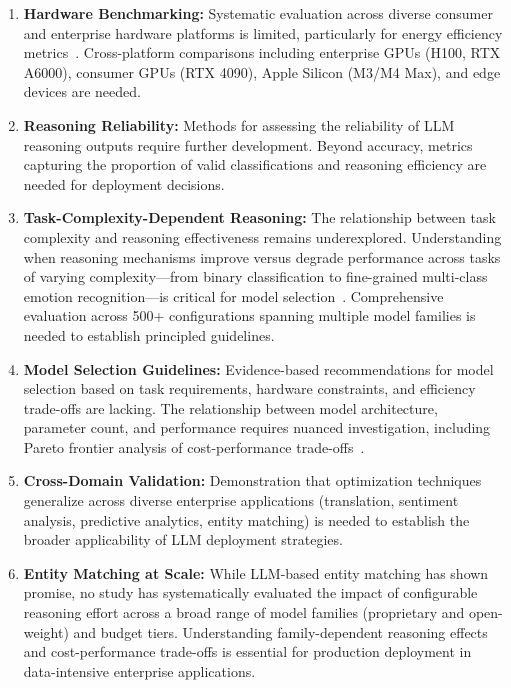 \begin{enumerate}[leftmargin=*]
    \item \textbf{Hardware Benchmarking:} Systematic evaluation across diverse consumer and enterprise hardware platforms is limited, particularly for energy efficiency metrics~\cite{chitty2024llm}. Cross-platform comparisons including enterprise GPUs (H100, RTX A6000), consumer GPUs (RTX 4090), Apple Silicon (M3/M4 Max), and edge devices are needed.
    
    \item \textbf{Reasoning Reliability:} Methods for assessing the reliability of LLM reasoning outputs require further development. Beyond accuracy, metrics capturing the proportion of valid classifications and reasoning efficiency are needed for deployment decisions.
    
    \item \textbf{Task-Complexity-Dependent Reasoning:} The relationship between task complexity and reasoning effectiveness remains underexplored. Understanding when reasoning mechanisms improve versus degrade performance across tasks of varying complexity---from binary classification to fine-grained multi-class emotion recognition---is critical for model selection~\cite{li2025financial}. Comprehensive evaluation across 500+ configurations spanning multiple model families is needed to establish principled guidelines.
    
    \item \textbf{Model Selection Guidelines:} Evidence-based recommendations for model selection based on task requirements, hardware constraints, and efficiency trade-offs are lacking. The relationship between model architecture, parameter count, and performance requires nuanced investigation, including Pareto frontier analysis of cost-performance trade-offs~\cite{guo2025deepseek,yang2024qwen2.5}.
    
    \item \textbf{Cross-Domain Validation:} Demonstration that optimization techniques generalize across diverse enterprise applications (translation, sentiment analysis, predictive analytics, entity matching) is needed to establish the broader applicability of LLM deployment strategies.

    \item \textbf{Entity Matching at Scale:} While LLM-based entity matching has shown promise, no study has systematically evaluated the impact of configurable reasoning effort across a broad range of model families (proprietary and open-weight) and budget tiers.  Understanding family-dependent reasoning effects and cost-performance trade-offs is essential for production deployment in data-intensive enterprise applications.
\end{enumerate}

